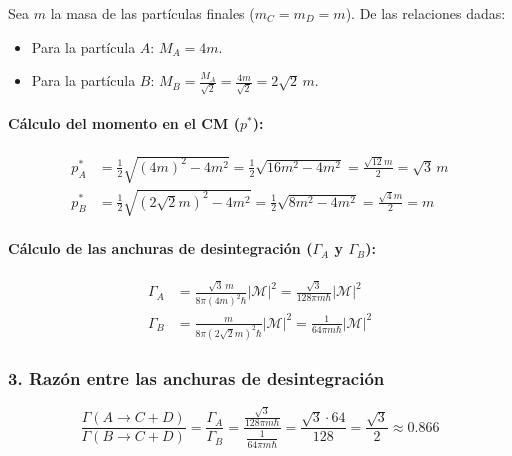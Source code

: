 \begin{problema}
Sea $m$ la masa de las partículas finales ($m_C = m_D = m$). De las relaciones dadas:
\begin{itemize}
    \item Para la partícula $A$: $M_A = 4m$.
    \item Para la partícula $B$: $M_B = \frac{M_A}{\sqrt{2}} = \frac{4m}{\sqrt{2}} = 2\sqrt{2}\, m$.
\end{itemize}

\paragraph{Cálculo del momento en el CM ($p^*$):}
\begin{align*}
p_A^* &= \frac{1}{2} \sqrt{(4m)^2 - 4m^2} = \frac{1}{2} \sqrt{16m^2 - 4m^2} = \frac{\sqrt{12} m}{2} = \sqrt{3}\, m \\
p_B^* &= \frac{1}{2} \sqrt{(2\sqrt{2}m)^2 - 4m^2} = \frac{1}{2} \sqrt{8m^2 - 4m^2} = \frac{\sqrt{4} m}{2} = m
\end{align*}

\paragraph{Cálculo de las anchuras de desintegración ($\Gamma_A$ y $\Gamma_B$):}
\begin{align*}
\Gamma_A &= \frac{\sqrt{3}\, m}{8 \pi (4m)^2 \hbar} |\mathcal{M}|^2 = \frac{\sqrt{3}}{128 \pi m \hbar} |\mathcal{M}|^2 \\
\Gamma_B &= \frac{m}{8 \pi (2\sqrt{2}m)^2 \hbar} |\mathcal{M}|^2 = \frac{1}{64 \pi m \hbar} |\mathcal{M}|^2
\end{align*}

\subsubsection*{3. Razón entre las anchuras de desintegración}
\begin{equation*}
\frac{\Gamma(A\rightarrow C+D)}{\Gamma(B\rightarrow C+D)} = \frac{\Gamma_A}{\Gamma_B} = \frac{\frac{\sqrt{3}}{128 \pi m \hbar}}{\frac{1}{64 \pi m \hbar}} = \frac{\sqrt{3} \cdot 64}{128} = \frac{\sqrt{3}}{2} \approx \mathbf{0.866}
\end{equation*}
\end{problema}


\newpage
